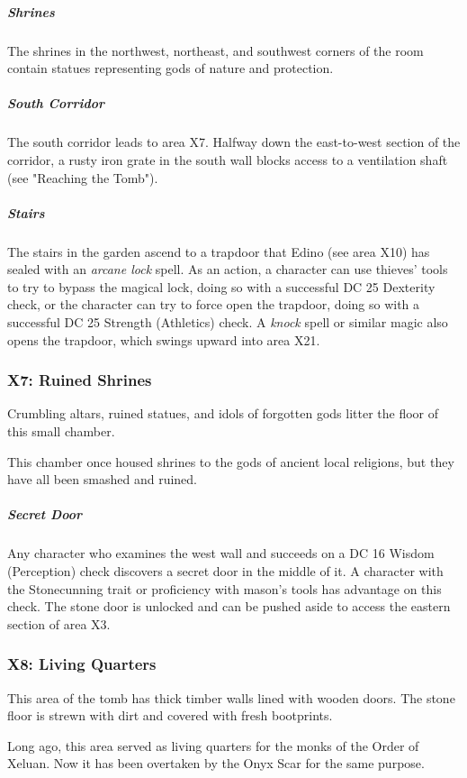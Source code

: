 \documentclass[10pt,a4paper,twoside,bg=print,twocolumn,openany,nodeprecatedcode]{dndbook}
\begin{document}
\subparagraph{Shrines}
The shrines in the northwest, northeast, and southwest corners of the room contain statues representing gods of nature and protection.

\subparagraph{South Corridor}
The south corridor leads to area X7. Halfway down the east-to-west section of the corridor, a rusty iron grate in the south wall blocks access to a ventilation shaft (see "Reaching the Tomb").

\subparagraph{Stairs}
The stairs in the garden ascend to a trapdoor that Edino (see area X10) has sealed with an \textit{arcane lock} spell. As an action, a character can use thieves' tools to try to bypass the magical lock, doing so with a successful DC 25 Dexterity check, or the character can try to force open the trapdoor, doing so with a successful DC 25 Strength (Athletics) check. A \textit{knock} spell or similar magic also opens the trapdoor, which swings upward into area X21.

\subsubsection{X7: Ruined Shrines}
\begin{DndReadAloud}{}
Crumbling altars, ruined statues, and idols of forgotten gods litter the floor of this small chamber.

\end{DndReadAloud}

This chamber once housed shrines to the gods of ancient local religions, but they have all been smashed and ruined.

\subparagraph{Secret Door}
Any character who examines the west wall and succeeds on a DC 16 Wisdom (Perception) check discovers a secret door in the middle of it. A character with the Stonecunning trait or proficiency with mason's tools has advantage on this check. The stone door is unlocked and can be pushed aside to access the eastern section of area X3.

\subsubsection{X8: Living Quarters}
\begin{DndReadAloud}{}
This area of the tomb has thick timber walls lined with wooden doors. The stone floor is strewn with dirt and covered with fresh bootprints.

\end{DndReadAloud}

Long ago, this area served as living quarters for the monks of the Order of Xeluan. Now it has been overtaken by the Onyx Scar for the same purpose.
\end{document}
